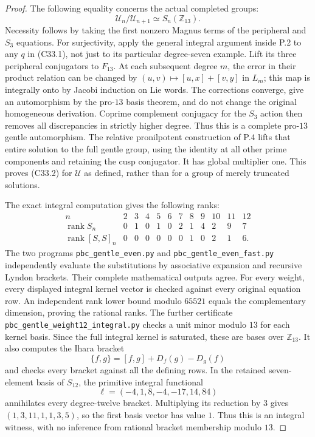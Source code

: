 \begin{proof}
The following equality concerns the actual completed groups:
\[
 \mathcal U_n/\mathcal U_{n+1}\simeq S_n(\mathbb Z_{13}).
                                                               \tag{C33.2}
\]
Necessity follows by taking the first nonzero Magnus terms of the
peripheral and $S_3$ equations.  For surjectivity, apply the general
integral argument inside P.2 to any $q$ in (C33.1), not just to its
particular degree-seven example.  Lift its three peripheral
conjugators to $F_{13}$.  At each subsequent degree $m$, the error
in their product relation can be changed by
$(u,v)\mapsto[u,x]+[v,y]$ in $L_m$; this map is integrally onto
by Jacobi induction on Lie words.  The corrections converge,
give an automorphism by the pro-$13$ basis theorem, and do not
change the original homogeneous derivation.  Coprime complement
conjugacy for the $S_3$ action then removes all discrepancies in
strictly higher degree.  Thus this is a complete pro-$13$
gentle automorphism.  The relative pronilpotent construction of
P.4 lifts that entire solution to the full gentle group, using
the identity at all other prime components and retaining the
cusp conjugator.  It has global multiplier one.  This proves
(C33.2) for $\mathcal U$ as defined, rather than for a group
of merely truncated solutions.

The exact integral computation gives the following ranks:
\[
\begin{array}{c|rrrrrrrrrrr}
 n&2&3&4&5&6&7&8&9&10&11&12\\ \hline
 \operatorname{rank}S_n&0&1&0&1&0&2&1&4&2&9&7\\
 \operatorname{rank}[S,S]_n&0&0&0&0&0&0&1&0&2&1&6 .
\end{array}                                                    \tag{C33.3}
\]
The two programs \texttt{pbc\_gentle\_even.py} and
\texttt{pbc\_gentle\_even\_fast.py} independently evaluate the
substitutions by associative expansion and recursive Lyndon
brackets.  Their complete mathematical outputs agree.
For every weight, every displayed integral kernel vector is
checked against every original equation row.  An independent
rank lower bound modulo $65521$ equals the complementary
dimension, proving the rational ranks.  The further certificate
\texttt{pbc\_gentle\_weight12\_integral.py} checks a unit minor
modulo $13$ for each kernel basis.  Since the full integral
kernel is saturated, these are bases over $\mathbb Z_{13}$.
It also computes the Ihara bracket
\[
 \{f,g\}=[f,g]+D_f(g)-D_g(f)
\]
and checks every bracket against all the defining rows.
In the retained seven-element basis of $S_{12}$, the primitive
integral functional
\[
             \ell=(-4,1,8,-4,-17,14,84)                         \tag{C33.4}
\]
annihilates every degree-twelve bracket.  Multiplying its reduction
by $3$ gives $(1,3,11,1,1,3,5)$, so the first basis vector has
value $1$.  Thus this is an integral witness, with no inference
from rational bracket membership modulo $13$.


\end{proof}
